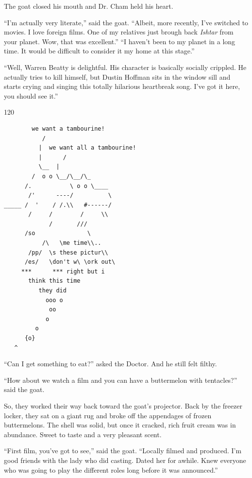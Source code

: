 \documentclass[12pt,twoside]{report}
\begin{document}
The goat closed his mouth and Dr. Cham held his heart.

``I'm actually very literate,'' said the goat.  ``Albeit, more
recently, I've switched to movies.  I love foreign films.  One of my
relatives just brough back {\em Ishtar} from your planet.  Wow, that
was excellent.''  ``I haven't been to my planet in a long time.  It
would be difficult to consider it my home at this stage.''

``Well, Warren Beatty is delightful.  His character is basically
socially crippled.  He actually tries to kill himself, but Dustin
Hoffman sits in the window sill and starts crying and singing this
totally hilarious heartbreak song.  I've got it here, you should see
it.''

	\begin{sidebar}{}{120}
\begin{verbatim}
		we want a tambourine!
           /
          |  we want all a tambourine!
          |      /
          \__  |
        /  o o \__/\__/\_
      /.           \ o o \____
       /'      ----/          \
_____ /  '    / /.\\   #------/
       /     /        /     \\
             /       ///
      /so               \
           /\   \me time\\..
       /pp/  \s these pictur\\
      /es/   \don't w\ \ork out\
     ***      *** right but i
       think this time
          they did
            ooo o
             oo
            o
         o
      {o}
   ^
\end{verbatim}
	\end{sidebar}

``Can I get something to eat?'' asked the Doctor.  And he still felt
filthy.

``How about we watch a film and you can have a buttermelon with
tentacles?'' said the goat.

So, they worked their way back toward the goat's projector.  Back by
the freezer locker, they sat on a giant rug and broke off the
appendages of frozen buttermelons.  The shell was solid, but once it
cracked, rich fruit cream was in abundance.  Sweet to taste and a very
pleasant scent.

``First film, you've got to see,'' said the goat.  ``Locally filmed
and produced.  I'm good friends with the lady who did casting.  Dated
her for awhile.  Knew everyone who was going to play the different
roles long before it was announced.''
\end{document}
